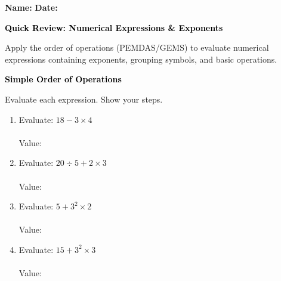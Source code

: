 \documentclass[12pt, letterpaper, fleqn]{article}
\newcommand{\blanklong}{\underline{\hspace{6.5cm}}}
\begin{document}
\textbf{Name:} \underline{\hspace{5cm}}
\hfill
\textbf{Date:} \underline{\hspace{3cm}}\\

\begin{tcolorbox}[colback=black!10]
    \large\textcolor{black}{\textbf{Quick Review: Numerical Expressions \& Exponents}}
\end{tcolorbox}

\vspace{3mm}
\noindent
Apply the order of operations (PEMDAS/GEMS) to evaluate numerical expressions containing exponents, grouping symbols, and basic operations.

\vspace{4mm}

\begin{tcolorbox}[colback=black!10]
\large\textcolor{black}{\textbf{Simple Order of Operations}}
\end{tcolorbox}

\noindent
Evaluate each expression. Show your steps.

\vspace{3mm}

\begin{enumerate}[itemsep=1cm, leftmargin=0.6cm]

\item Evaluate: $18 - 3 \times 4$ \\ \\
Value: \blanklong

\vspace{1cm}

\item Evaluate: $20 \div 5 + 2 \times 3$ \\ \\
Value: \blanklong

\vspace{1cm}

\item Evaluate: $5 + 3^2 \times 2$ \\ \\
Value: \blanklong

\vspace{1cm}

\item Evaluate: $15 + 3^2 \times 3$ \\ \\
Value: \blanklong

\vspace{1cm}

\end{enumerate}
\end{document}
